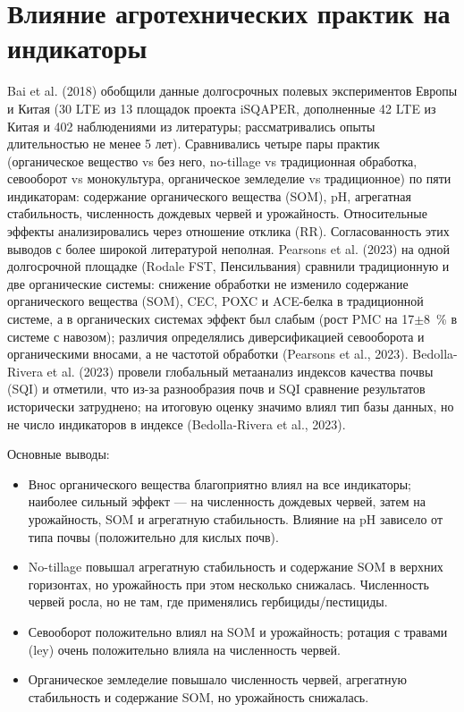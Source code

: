 \documentclass[11pt,a4paper]{article}
\begin{document}
\section{Влияние агротехнических практик на индикаторы}
\label{sec:practices}

Bai et al. (2018) обобщили данные долгосрочных полевых экспериментов Европы и
Китая (30 LTE из 13 площадок проекта iSQAPER, дополненные 42 LTE из Китая и
402 наблюдениями из литературы; рассматривались опыты длительностью не менее
5 лет). Сравнивались четыре пары практик (органическое вещество vs без него,
no-tillage vs традиционная обработка, севооборот vs монокультура, органическое
земледелие vs традиционное) по пяти индикаторам: содержание органического
вещества (SOM), pH, агрегатная стабильность, численность дождевых червей и
урожайность. Относительные эффекты анализировались через отношение отклика
(RR). Согласованность этих выводов с более широкой литературой неполная.
Pearsons et al. (2023) на одной долгосрочной площадке (Rodale FST,
Пенсильвания) сравнили традиционную и две органические системы:
снижение обработки не изменило содержание органического вещества (SOM),
CEC, POXC и ACE-белка в традиционной системе, а в органических системах
эффект был слабым (рост PMC на 17$\pm$8~\% в системе с навозом); различия
определялись диверсификацией севооборота и органическими вносами, а не
частотой обработки (Pearsons et al., 2023).
Bedolla-Rivera et al. (2023) провели глобальный метаанализ индексов
качества почвы (SQI) и отметили, что из-за разнообразия почв и SQI
сравнение результатов исторически затруднено; на итоговую оценку значимо
влиял тип базы данных, но не число индикаторов в индексе
(Bedolla-Rivera et al., 2023).

Основные выводы:
\begin{itemize}
  \item Внос органического вещества благоприятно влиял на все индикаторы;
  наиболее сильный эффект --- на численность дождевых червей, затем на
  урожайность, SOM и агрегатную стабильность. Влияние на pH зависело от типа
  почвы (положительно для кислых почв).
  \item No-tillage повышал агрегатную стабильность и содержание SOM в верхних
  горизонтах, но урожайность при этом несколько снижалась. Численность червей
  росла, но не там, где применялись гербициды/пестициды.
  \item Севооборот положительно влиял на SOM и урожайность; ротация с травами
  (ley) очень положительно влияла на численность червей.
  \item Органическое земледелие повышало численность червей, агрегатную
  стабильность и содержание SOM, но урожайность снижалась.
\end{itemize}
\end{document}
